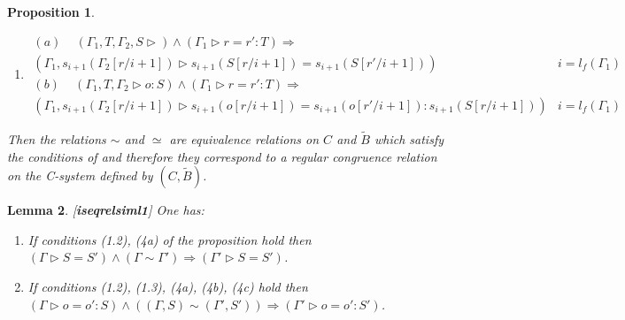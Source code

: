 \documentclass[11pt]{article}
\newtheorem{proposition}{Proposition}[subsection]
\newtheorem{lemma}[proposition]{Lemma}
\newcommand{\llabel}[1]{\label{#1}[{\bf #1}]}
\newcommand{\wt}{\widetilde}
\newcommand{\spc}{{\,\,\,\,\,\,\,}}
\newcommand{\impl}{{\Rightarrow}}
\begin{document}
\begin{proposition}
\begin{enumerate}
$$\begin{array}{ll}
(\Gamma_1,s_{i+1}(\Gamma_2[r/i+1])\rhd s_{i+1}(S[r/i+1])=s_{i+1}(S'[r/i+1]))&i=l_f(\Gamma_1)\\
(b)\spc (\Gamma_1,T,\Gamma_2\rhd o=o':S)\wedge(\Gamma_1\rhd r:T)\impl&\\
(\Gamma_1,s_{i+1}(\Gamma_2[r/i+1])\rhd s_{i+1}(o[r/i+1])=s_{i+1}(o'[r/i+1]):s_{i+1}(S[r/i+1]))&i=l_f(\Gamma_1)
\end{array}
$$
%
\item 
%
$$
\begin{array}{ll}
(a)\spc (\Gamma_1,T,\Gamma_2,S\rhd)\wedge(\Gamma_1\rhd r=r':T)\impl&\\
(\Gamma_1,s_{i+1}(\Gamma_2[r/i+1])\rhd s_{i+1}(S[r/i+1])=s_{i+1}(S[r'/i+1]))&i=l_f(\Gamma_1)\\
(b)\spc (\Gamma_1,T,\Gamma_2\rhd o:S)\wedge(\Gamma_1\rhd r=r':T)\impl&\\
(\Gamma_1,s_{i+1}(\Gamma_2[r/i+1])\rhd s_{i+1}(o[r/i+1])=s_{i+1}(o[r'/i+1]):s_{i+1}(S[r/i+1]))&i=l_f(\Gamma_1)
\end{array}
$$
\end{enumerate}
%
Then the relations $\sim$ and $\simeq$ are equivalence relations on $C$ and $\wt{B}$ which satisfy the conditions of \cite[Proposition 5.4]{Csubsystems} and therefore they correspond to a regular congruence relation on the C-system defined by $(C,\wt{B})$. 
\end{proposition}
%
\begin{lemma}
\llabel{iseqrelsiml1}
One has:
%
\begin{enumerate}
\item If conditions (1.2), (4a) of the proposition hold then $(\Gamma\rhd S=S')\wedge(\Gamma\sim\Gamma')\impl (\Gamma'\rhd S=S')$.
\item If conditions (1.2), (1.3), (4a), (4b), (4c) hold then $(\Gamma\rhd o=o':S)\wedge((\Gamma,S)\sim(\Gamma',S'))\impl (\Gamma'\rhd o=o':S')$.
\end{enumerate}
\end{lemma}
%
\end{document}
